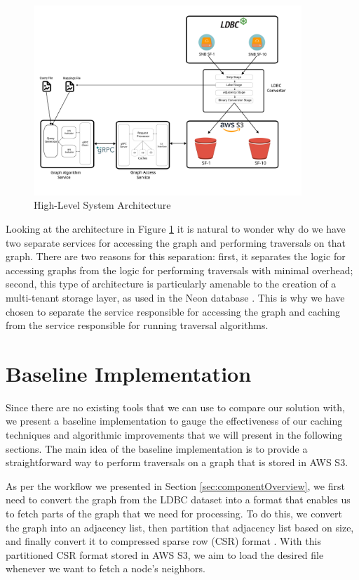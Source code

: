 \begin{figure}[ht]
    \centering
    \includegraphics[width=0.9\textwidth]{figures/architecture.png}
    \caption{High-Level System Architecture}
    \label{fig:sysArch}
\end{figure}

Looking at the architecture in Figure \ref{fig:sysArch} it is natural to wonder
why do we have two separate services for accessing the graph and performing
traversals on that graph. There are two reasons for this separation: first, it
separates the logic for accessing graphs from the logic for performing
traversals with minimal overhead; second, this type of architecture is
particularly amenable to the creation of a multi-tenant storage layer, as used
in the Neon database \cite{neonPostgres}. This is why we have chosen to separate
the service responsible for accessing the graph and caching from the service
responsible for running traversal algorithms.

\section{Baseline Implementation}\label{sec:baseline}
Since there are no existing tools that we can use to compare our solution with,
we present a baseline implementation to gauge the effectiveness of our caching
techniques and algorithmic improvements that we will present in the following
sections. The main idea of the baseline implementation is to provide a
straightforward way to perform traversals on a graph that is stored in AWS S3.

\medskip
As per the workflow we presented in Section \ref{sec:componentOverview}, we
first need to convert the graph from the LDBC dataset into a format that
enables us to fetch parts of the graph that we need for processing. To
do this, we convert the graph into an adjacency list, then partition that
adjacency list based on size, and finally convert it to compressed sparse
row (CSR) format \cite{duff1984computer}. With this partitioned CSR format stored
in AWS S3, we aim to load the desired file whenever we want to fetch a node's
neighbors.

